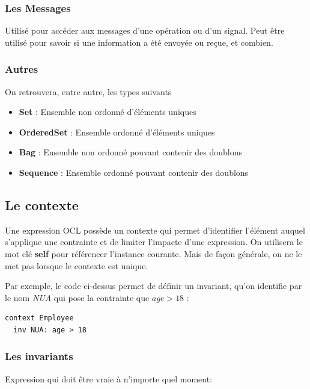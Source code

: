 \documentclass[../Syllabus.tex]{subfiles}
\begin{document}
\subsubsection{Les Messages}

Utilisé pour accéder aux messages d'une opération ou d'un signal. Peut être utilisé pour savoir si une information a été envoyée ou reçue, et combien.

\subsubsection{Autres}

On retrouvera, entre autre, les types suivants

\begin{itemize}
  \item \textbf{Set} : Ensemble non ordonné d'éléments uniques
  \item \textbf{OrderedSet} : Ensemble ordonné d'éléments uniques
  \item \textbf{Bag} : Ensemble non ordonné pouvant contenir des doublons
  \item \textbf{Sequence} : Ensemble ordonné pouvant contenir des doublons
\end{itemize}


\subsection{Le contexte}

Une expression OCL possède un contexte qui permet d'identifier l'élément auquel s'applique une contrainte et de limiter l'impacte d'une expression. On utilisera le mot clé \textbf{self} pour référencer l'instance courante. Mais de façon générale, on ne le met pas lorsque le contexte est unique.

\vspace{0.5cm}

Par exemple, le code ci-dessus permet de définir un invariant, qu'on identifie par le nom \textit{NUA} qui pose la contrainte que $age > 18$ :
\begin{lstlisting}[language=OCL]
  context Employee
  inv NUA: age > 18
\end{lstlisting}

\subsubsection{Les invariants}

Expression qui doit être vraie à n'importe quel moment:
\end{document}
